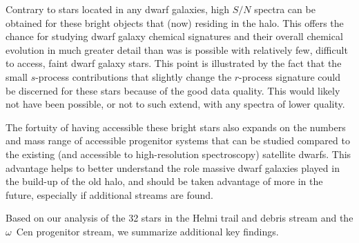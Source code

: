 \documentclass[twocolumn]{aastex63}
\begin{document}
Contrary to stars located in any dwarf galaxies, high $S/N$ spectra can be obtained for these bright objects that (now) residing in the halo. This offers the chance for studying dwarf galaxy chemical signatures and their overall chemical evolution in much greater detail than was is possible with relatively few, difficult to access, faint dwarf galaxy stars. This point is illustrated by the fact that the small $s$-process contributions that slightly change the $r$-process signature could be discerned for these stars because of the good data quality. This would likely not have been possible, or not to such extend, with any spectra of lower quality. 

The fortuity of having accessible these bright stars also expands on the numbers and mass range of accessible progenitor systems that can be studied compared to the existing (and accessible to high-resolution spectroscopy) satellite dwarfs. This advantage helps to better understand the role massive dwarf galaxies played in the build-up of the old halo, and should be taken advantage of more in the future, especially if additional streams are found. 

Based on our analysis of the 32 stars in the Helmi trail and debris stream and the $\omega$~Cen progenitor stream, we summarize additional key findings. 
\end{document}
